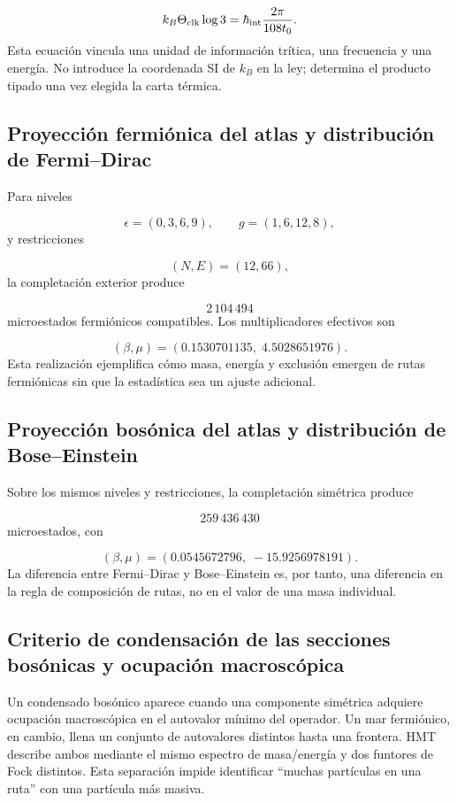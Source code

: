 \[
 k_B\Theta_{\rm clk}\log3
 =\hbar_{\rm int}\frac{2\pi}{108t_0}.
\]
Esta ecuación vincula una unidad de información trítica, una frecuencia y una energía. No introduce la coordenada SI de \(k_B\) en la ley; determina el producto tipado una vez elegida la carta térmica.

\subsection{Proyección fermiónica del atlas y distribución de Fermi–Dirac}
Para niveles

\[
 \epsilon=(0,3,6,9),\qquad
 g=(1,6,12,8),
\]
y restricciones

\[
 (N,E)=(12,66),
\]
la completación exterior produce

\[
 2\,104\,494
\]
microestados fermiónicos compatibles. Los multiplicadores efectivos son

\[
 (\beta,\mu)
 =(0.1530701135,\;4.5028651976).
\]
Esta realización ejemplifica cómo masa, energía y exclusión emergen de rutas fermiónicas sin que la estadística sea un ajuste adicional.

\subsection{Proyección bosónica del atlas y distribución de Bose–Einstein}
Sobre los mismos niveles y restricciones, la completación simétrica produce

\[
 259\,436\,430
\]
microestados, con

\[
 (\beta,\mu)
 =(0.0545672796,\;-15.9256978191).
\]
La diferencia entre Fermi--Dirac y Bose--Einstein es, por tanto, una diferencia en la regla de composición de rutas, no en el valor de una masa individual.

\subsection{Criterio de condensación de las secciones bosónicas y ocupación macroscópica}
Un condensado bosónico aparece cuando una componente simétrica adquiere ocupación macroscópica en el autovalor mínimo del operador. Un mar fermiónico, en cambio, llena un conjunto de autovalores distintos hasta una frontera. HMT describe ambos mediante el mismo espectro de masa/energía y dos funtores de Fock distintos. Esta separación impide identificar “muchas partículas en una ruta” con una partícula más masiva.

